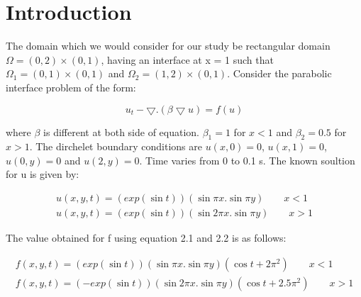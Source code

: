 \documentclass{report}
\numberwithin{equation}{chapter}
\begin{document}
\section{Introduction}
\begin{spacing}{1.5}
The domain which we would consider for our study be rectangular domain $\Omega = (0,2)\times(0,1)$, having an interface at x = 1 such that $\Omega_{1} = (0,1)\times(0,1)$ and $\Omega_{2} = (1,2)\times(0,1)$. Consider the parabolic interface problem of the form:
 \begin{center}
    \begin{equation}
       u_{t}-\bigtriangledown.\left(\beta \bigtriangledown u \right) = f(u)
    \end{equation}
 \end{center}
 where $\beta$ is different at both side of equation. $\beta_{1} = 1$ for $x<1$ and $\beta_{2} = 0.5$ for $x>1$. The dirchelet boundary conditions are $u(x,0) = 0$, $u(x,1) = 0$, $u(0,y) = 0$ and $u(2,y) = 0$. Time varies from 0 to 0.1 s. The known soultion for u is given by:\\
  \begin{center}
     \begin{equation}
     	\begin{split}
     	u(x,y,t) = (exp(\sin t))(\sin\pi x . \sin\pi y) \qquad x<1 \\
     	u(x,y,t) = (exp(\sin t))(\sin 2\pi x . \sin\pi y) \qquad x>1
     	\end{split}
     \end{equation}
  \end{center}
	The value obtained for f using equation 2.1 and 2.2 is as follows:
 \begin{center}
     \begin{equation}
     	\begin{split}
     	f(x,y,t) = (exp(\sin t))(\sin\pi x . \sin\pi y)(\cos t + 2\pi^2) \qquad x<1 \\
     	f(x,y,t) = (-exp(\sin t))(\sin 2\pi x . \sin\pi y)(\cos t + 2.5\pi^2) \qquad x>1
     	\end{split}
     \end{equation}
  \end{center}
\end{spacing}
\end{document}
